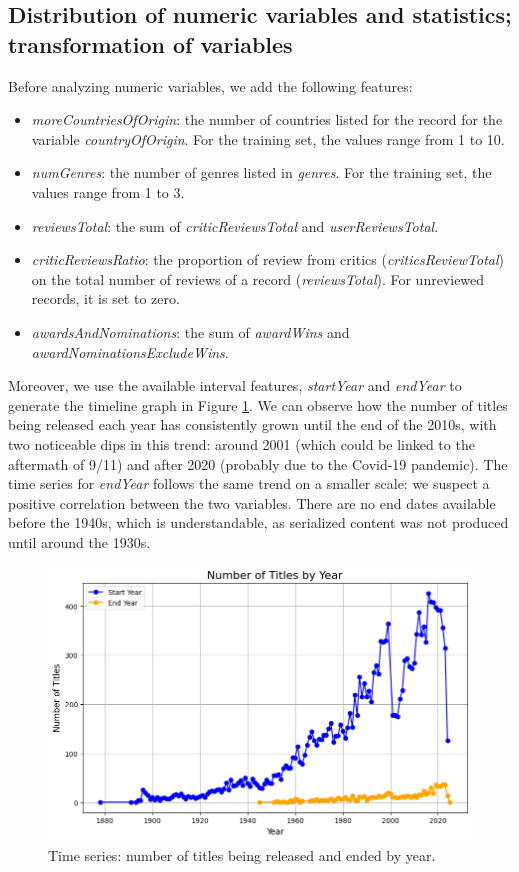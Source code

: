 \subsection{Distribution of numeric variables and statistics; transformation of variables}
\label{numeric_vars_analysis}
Before analyzing numeric variables, we add the following features:
\begin{itemize}
    \item \textit{moreCountriesOfOrigin}: the number of countries listed for the record for the variable \textit{countryOfOrigin}. For the training set, the values range from 1 to 10.
    \item \textit{numGenres}: the number of genres listed in \textit{genres}. For the training set, the values range from 1 to 3.
    \item \textit{reviewsTotal}: the sum of \textit{criticReviewsTotal} and \textit{userReviewsTotal}.
    \item \textit{criticReviewsRatio}: the proportion of review from critics (\textit{criticsReviewTotal}) on the total number of reviews of a record (\textit{reviewsTotal}). For unreviewed records, it is set to zero.
    \item \textit{awardsAndNominations}: the sum of \textit{awardWins} and \textit{awardNominationsExcludeWins}.
\end{itemize}

Moreover, we use the available interval features, \textit{startYear} and \textit{endYear} to generate the timeline graph in Figure \ref{fig:timeline_graph.png}. We can observe how the number of titles being released each year has consistently grown until the end of the 2010s, with two noticeable dips in this trend: around 2001 (which could be linked to the aftermath of 9/11) and after 2020 (probably due to the Covid-19 pandemic). The time series for \textit{endYear} follows the same trend on a smaller scale: we suspect a positive correlation between the two variables. There are no end dates available before the 1940s, which is understandable, as serialized content was not produced until around the 1930s.

\begin{figure}
    \includegraphics[width=\columnwidth]{../results/images/timeline_graph.png}
    \caption{Time series: number of titles being released and ended by year.}
    \label{fig:timeline_graph.png}
\end{figure}

